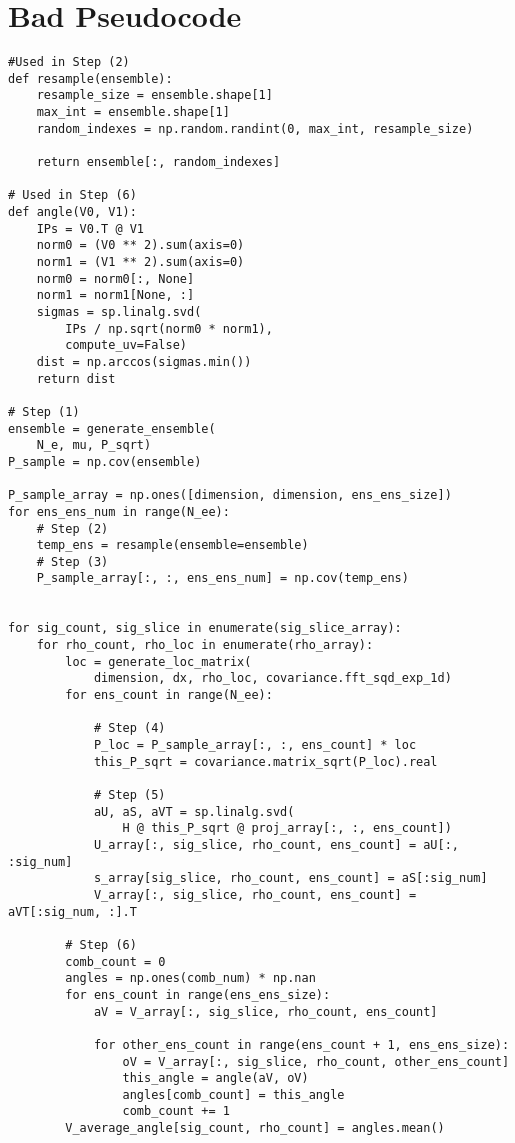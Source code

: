 \documentclass[11pt]{amsart}
\begin{document}
\section{Bad Pseudocode}
\begin{verbatim}
#Used in Step (2)
def resample(ensemble):
    resample_size = ensemble.shape[1]
    max_int = ensemble.shape[1]
    random_indexes = np.random.randint(0, max_int, resample_size)

    return ensemble[:, random_indexes]

# Used in Step (6)
def angle(V0, V1):
    IPs = V0.T @ V1
    norm0 = (V0 ** 2).sum(axis=0)
    norm1 = (V1 ** 2).sum(axis=0)
    norm0 = norm0[:, None]
    norm1 = norm1[None, :]
    sigmas = sp.linalg.svd(
        IPs / np.sqrt(norm0 * norm1),
        compute_uv=False)
    dist = np.arccos(sigmas.min())
    return dist

# Step (1)
ensemble = generate_ensemble(
    N_e, mu, P_sqrt)
P_sample = np.cov(ensemble)

P_sample_array = np.ones([dimension, dimension, ens_ens_size])
for ens_ens_num in range(N_ee):
    # Step (2)
    temp_ens = resample(ensemble=ensemble)
    # Step (3)
    P_sample_array[:, :, ens_ens_num] = np.cov(temp_ens)


for sig_count, sig_slice in enumerate(sig_slice_array):
    for rho_count, rho_loc in enumerate(rho_array):
        loc = generate_loc_matrix(
            dimension, dx, rho_loc, covariance.fft_sqd_exp_1d)
        for ens_count in range(N_ee):

            # Step (4)
            P_loc = P_sample_array[:, :, ens_count] * loc
            this_P_sqrt = covariance.matrix_sqrt(P_loc).real

            # Step (5)
            aU, aS, aVT = sp.linalg.svd(
                H @ this_P_sqrt @ proj_array[:, :, ens_count])
            U_array[:, sig_slice, rho_count, ens_count] = aU[:, :sig_num]
            s_array[sig_slice, rho_count, ens_count] = aS[:sig_num]
            V_array[:, sig_slice, rho_count, ens_count] = aVT[:sig_num, :].T

        # Step (6)
        comb_count = 0
        angles = np.ones(comb_num) * np.nan
        for ens_count in range(ens_ens_size):
            aV = V_array[:, sig_slice, rho_count, ens_count]

            for other_ens_count in range(ens_count + 1, ens_ens_size):
                oV = V_array[:, sig_slice, rho_count, other_ens_count]
                this_angle = angle(aV, oV)
                angles[comb_count] = this_angle
                comb_count += 1
        V_average_angle[sig_count, rho_count] = angles.mean()


\end{verbatim}
\end{document}
